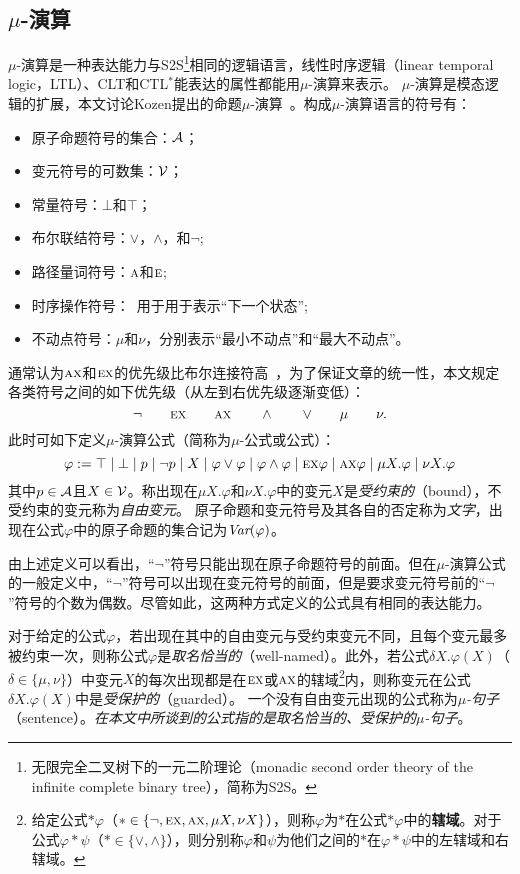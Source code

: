\subsection{$\mu$-演算}
$\mu$-演算是一种表达能力与S2S\footnote{无限完全二叉树下的一元二阶理论（monadic second order theory of the infinite complete binary tree），简称为S2S。}相同的逻辑语言，线性时序逻辑（linear temporal  logic，LTL）、CLT和CTL$^*$能表达的属性都能用$\mu$-演算来表示。
$\mu$-演算是模态逻辑的扩展，本文讨论Kozen提出的命题$\mu$-演算~\cite{DBLP:journals/cacm/Kozen83}。构成$\mu$-演算语言的符号有：
\begin{itemize}
	\item 原子命题符号的集合：$\cal A$；
	\item 变元符号的可数集：$\cal V$；
	\item 常量符号：$\bot$和$\top$；
	\item 布尔联结符号：$\vee$，$\wedge$，和$\neg$;
	\item 路径量词符号：$\textsc{a}$和$\textsc{e}$;
	\item 时序操作符号：\NEXT\ 用于用于表示“下一个状态”;
	\item 不动点符号：$\mu$和$\nu$，分别表示“最小不动点”和“最大不动点”。
\end{itemize}

通常认为$\textsc{a}\textsc{x}$和$\textsc{e}\textsc{x}$的优先级比布尔连接符高~\cite{bradfield2018mu}，为了保证文章的统一性，本文规定各类符号之间的如下优先级（从左到右优先级逐渐变低）：
\[
\neg\qquad \textsc{e}\textsc{x}\qquad \textsc{a}\textsc{x}\qquad \wedge\qquad \vee\qquad \mu\qquad \nu.
\]
此时可如下定义$\mu$-演算公式（简称为$\mu$-公式或公式）：
\[
\varphi := \top \mid \bot \mid p\mid \neg p\mid  X\mid \varphi \vee \varphi \mid \varphi \wedge \varphi \mid \textsc{e}\textsc{x} \varphi\mid \textsc{a}\textsc{x} \varphi \mid \mu X. \varphi\mid \nu X. \varphi
\]
其中$p\in {\cal A}$且$X\in {\cal V}$。称出现在$\mu X. \varphi$和$\nu X. \varphi$中的变元$X$是\emph{受约束的}（bound），不受约束的变元称为\emph{自由变元}。
原子命题和变元符号及其各自的否定称为\emph{文字}，出现在公式$\varphi$中的原子命题的集合记为$\textit{Var}(\varphi)$。

由上述定义可以看出，“$\neg$”符号只能出现在原子命题符号的前面。但在$\mu$-演算公式的一般定义中，“$\neg$”符号可以出现在变元符号的前面，但是要求变元符号前的“$\neg$”符号的个数为偶数。尽管如此，这两种方式定义的公式具有相同的表达能力。

对于给定的公式$\varphi$，若出现在其中的自由变元与受约束变元不同，且每个变元最多被约束一次，则称公式$\varphi$是\emph{取名恰当的}（well-named）。此外，若公式$\delta X.\varphi(X)$（$\delta \in \{\mu, \nu\}$）中变元$X$的每次出现都是在$\textsc{e}\textsc{x}$或$\textsc{a}\textsc{x}$的辖域\footnote{给定公式$*\varphi$（$*\in \{\neg, \textsc{e}\textsc{x},\textsc{a}\textsc{x}, \mu X, \nu X\}$），则称$\varphi$为$*$在公式$*\varphi$中的\textbf{辖域}。对于公式$\varphi * \psi$（$*\in \{\vee, \wedge\}$），则分别称$\varphi$和$\psi$为他们之间的$*$在$\varphi * \psi$中的左辖域和右辖域。}内，则称变元在公式$\delta X.\varphi(X)$中是\emph{受保护的}（guarded）。
一个没有自由变元出现的公式称为\emph{$\mu$-句子}（sentence）。\emph{在本文中所谈到的公式指的是取名恰当的、受保护的$\mu$-句子}。


